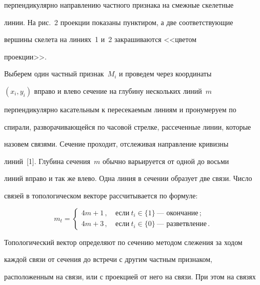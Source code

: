   


\noindent 


перпендикулярно направлению частного признака на смежные скелетные 


линии. На рис.~2 проекции показаны пунктиром, а две соответствующие 


вершины скелета на линиях~{1} и~{2} закрашиваются <<цветом 


проекции>>.


  


  








  Выберем один частный признак~$M_i$ и проведем через координаты 


$(x_i,y_i)$ вправо и влево сечение на глубину нескольких линий~$m$ 


перпендикулярно касательным к пересекаемым линиям и пронумеруем по 


спирали, разворачивающейся по часовой стрелке, рассеченные линии, которые 


назовем связями. Сечение проходит, отслеживая направление кривизны 


линий~[1]. Глубина сечения~$m$ обычно варьируется от одной до восьми 


линий вправо и так же влево. Одна линия в сечении образует две связи. Число 


связей в топологическом векторе рассчитывается по формуле:


  \begin{equation}


  m_t=\begin{cases} 


  4m+1\,, &\ \mbox{если}\ t_i\in \{1\}~\mbox{---\ окончание}\,;\\


  4m+3\,, &\ \mbox{если}\ t_i\in \{0\}~\mbox{---\ разветвление}\,.


  \end{cases}


  \label{e5-ush}


  \end{equation}


Топологический вектор определяют по сечению методом слежения за ходом 


каждой связи от сечения до встречи с другим частным признаком, 


расположенным на связи, или с проекцией от него на связи. При этом на связях 


